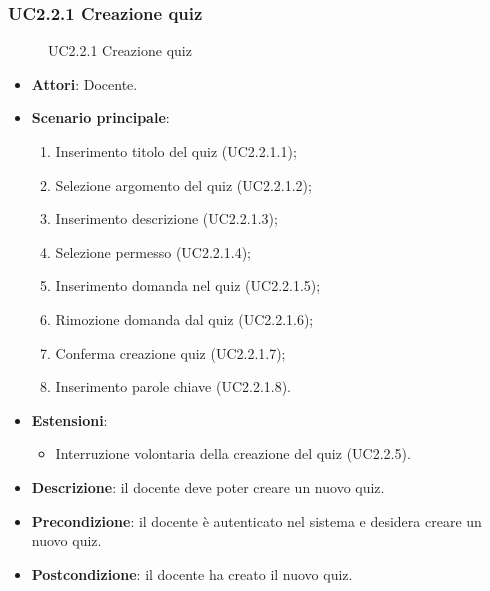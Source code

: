 \subsubsection{UC2.2.1 Creazione quiz}
\begin{figure}[H]
\centering
\noindent{}
\caption{UC2.2.1 Creazione quiz}
\end{figure}
\begin{itemize}
\item \textbf{Attori}: Docente.
\item \textbf{Scenario principale}:
\begin{enumerate}
\item Inserimento titolo del quiz (UC2.2.1.1);
\item Selezione argomento del quiz (UC2.2.1.2);
\item Inserimento descrizione (UC2.2.1.3);
\item Selezione permesso (UC2.2.1.4);
\item Inserimento domanda nel quiz (UC2.2.1.5);
\item Rimozione domanda dal quiz (UC2.2.1.6);
\item Conferma creazione quiz (UC2.2.1.7);
\item Inserimento parole chiave (UC2.2.1.8).
\end{enumerate}
\item \textbf{Estensioni}:
\begin{itemize}
\item Interruzione volontaria della creazione del quiz (UC2.2.5).
\end{itemize}
\item \textbf{Descrizione}: il docente deve poter creare un nuovo quiz.
\item \textbf{Precondizione}: il docente è autenticato nel sistema e desidera creare un nuovo quiz.
\item \textbf{Postcondizione}: il docente ha creato il nuovo quiz.
\end{itemize}
